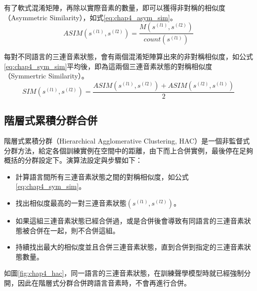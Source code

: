 有了軟式混淆矩陣，再除以實際音素的數量，即可以獲得非對稱的相似度（Asymmetric Similarity），如式\ref{eq:chap4_asym_sim}。
\begin{equation} \label{eq:chap4_asym_sim}
ASIM( s^{(l1)} , s^{(l2)} ) =  \frac{ M( s^{(l1)} , s^{(l2)}) } { count( s^{(l1)} )}
\end{equation}

每對不同語言的三連音素狀態，會有兩個混淆矩陣算出來的非對稱相似度，如公式\ref{eq:chap4_sym_sim}平均後，即為這兩個三連音素狀態的對稱相似度（Symmertric Similarity）。
\begin{equation} \label{eq:chap4_sym_sim}
SIM( s^{(l1)} , s^{(l2)} ) =  \frac{ ASIM( s^{(l1)} , s^{(l2)})  + ASIM( s^{(l2)} , s^{(l1)})} {2 }
\end{equation}
\subsection{階層式累積分群合併}

階層式累積分群（Hierarchical Agglomerative Clustering, HAC）是一個非監督式分群方法，給定各個訓練實例在空間中的距離，由下而上合併實例，最後停在足夠概括的分群設定下。演算法設定與步驟如下：

\begin{itemize}
 \itemsep -2pt
 \item 計算語言間所有三連音素狀態之間的對稱相似度，如公式\ref{eq:chap4_sym_sim}。
 \item 找出相似度最高的一對三連音素狀態$( s^{(l1)} , s^{(l2)}  )$。
 \item 如果這組三連音素狀態已經合併過，或是合併後會導致有同語言的三連音素狀態被合併在一起，則不合併這組。
 \item 持續找出最大的相似度並且合併三連音素狀態，直到合併到指定的三連音素狀態數量。
\end{itemize}

如圖\ref{fig:chap4_hac}，同一語言的三連音素狀態，在訓練聲學模型時就已經強制分開，因此在階層式分群合併跨語言音素時，不會再進行合併。

